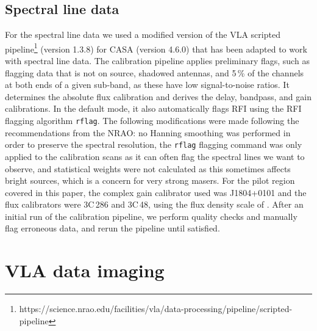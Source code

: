 \documentclass{aa}
\begin{document}
\subsection{Spectral line data}
For the spectral line data we used a modified version of the VLA scripted pipeline\footnote{https://science.nrao.edu/facilities/vla/data-processing/pipeline/scripted-pipeline} (version 1.3.8) for CASA (version 4.6.0) that has been adapted to work with spectral line data. The calibration pipeline applies preliminary flags, such as flagging data that is not on source, shadowed antennas, and 5\,\% of the channels at both ends of a given sub-band, as these have low signal-to-noise ratios. It determines the absolute flux calibration and derives the delay, bandpass, and gain calibrations. In the default mode, it also automatically flags RFI using the RFI flagging algorithm \texttt{rflag}.  The following modifications were made following the recommendations from the   NRAO: no Hanning smoothing was performed in order to preserve the spectral resolution, the \texttt{rflag} flagging command was only applied to the calibration scans as it can often flag the spectral lines we want to observe, and statistical weights were not calculated as this sometimes affects bright sources, which is a concern for very strong masers. For the pilot region covered in this paper, the complex gain calibrator used was J1804+0101 and the flux calibrators were 3C\,286 and 3C\,48, using the flux density scale of \cite{PerleyButler2013a}. After an initial run of the calibration pipeline, we perform quality checks and manually flag  erroneous data, and rerun the pipeline until satisfied.


\section{VLA data imaging}
\end{document}
